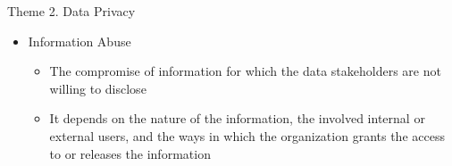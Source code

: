 \documentclass[
 size=14pt,
 paper=smartboard,  %
 mode=present, 		%
 display=slides, 	%
 style=tuliplab,  	%
 pauseslide,
 fleqn,leqno]{powerdot}{}
\begin{document}
\begin{slide}{Theme 2. Data Privacy}
\begin{itemize}
\item
Information Abuse

\begin{itemize}
\item
The compromise of information
for which the data stakeholders are not willing to disclose

\item
It depends on the nature of the information,
the involved internal or external users,
and the ways in which the organization grants the access to
or releases the information
\end{itemize}
\end{itemize}

\end{slide}


\end{document}
